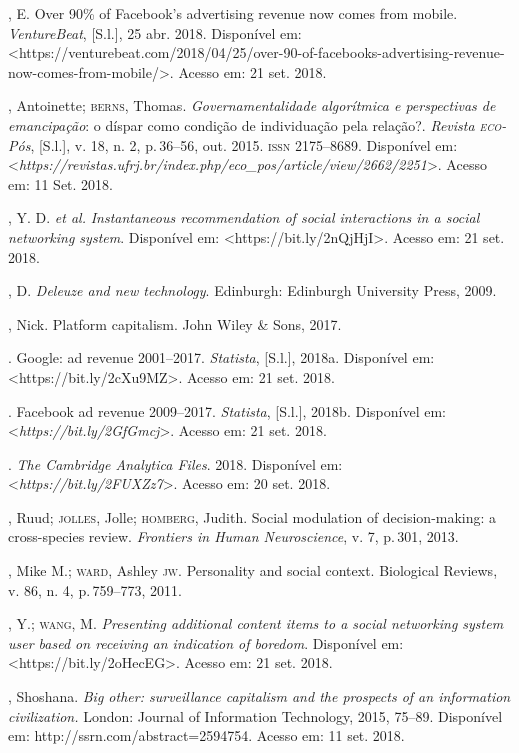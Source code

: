 \begin{bibliohedra}
, E. Over 90\% of Facebook's advertising revenue now comes
from mobile. \emph{VentureBeat}, {[}S.l.{]}, 25 abr. 2018. Disponível
em:
\textless{}https://venturebeat.com/2018/04/25/over-90-of-facebooks-advertising-revenue-now-comes-from-mobile/\textgreater{}.
Acesso em: 21 set. 2018.

, Antoinette; \textsc{berns}, Thomas. \emph{Governamentalidade
algorítmica e perspectivas de emancipação}: o díspar como condição de
individuação pela relação?. \emph{Revista \textsc{eco}-Pós}, {[}S.l.{]}, v. 18,
n. 2, p.\,36--56, out. 2015. \textsc{issn} 2175--8689. Disponível em:
\textless{}\emph{https://revistas.ufrj.br/index.php/eco\_pos/article/view/2662/2251}\textgreater{}.
Acesso em: 11 Set. 2018.

, Y. D. \emph{et al.} \emph{Instantaneous recommendation of
social interactions in a social networking system}. Disponível em:
\textless{}https://bit.ly/2nQjHjI\textgreater{}.
Acesso em: 21 set. 2018.

, D. \emph{Deleuze and new technology}. Edinburgh: Edinburgh
University Press, 2009.

, Nick. Platform capitalism. John Wiley \& Sons, 2017.

. Google: ad revenue 2001--2017. \emph{Statista}, {[}S.l.{]},
2018a. Disponível em: \textless{}https://bit.ly/2cXu9MZ\textgreater{}.
Acesso em: 21 set. 2018.

\titidem. Facebook ad revenue 2009--2017. \emph{Statista},
{[}S.l.{]}, 2018b. Disponível em:
\textless{}\emph{https://bit.ly/2GfGmcj}\textgreater{}.
Acesso em: 21 set. 2018.

. \emph{The Cambridge Analytica Files}. 2018. Disponível
em: \textless{}\emph{https://bit.ly/2FUXZz7}\textgreater{}. Acesso em: 20 set. 2018.

, Ruud; \textsc{jolles}, Jolle; \textsc{homberg}, Judith. Social modulation of
decision-making: a cross-species review. \emph{Frontiers in Human
Neuroscience}, v. 7, p.\,301, 2013.

, Mike M.; \textsc{ward}, Ashley \textsc{jw}. Personality and social context.
Biological Reviews, v. 86, n. 4, p.\,759--773, 2011.

, Y.; \textsc{wang}, M. \emph{Presenting additional content items to a social
networking system user based on receiving an indication of boredom}.
Disponível em:
\textless{}https://bit.ly/2oHecEG\textgreater{}.
Acesso em: 21 set. 2018.

, Shoshana. \emph{Big other: surveillance capitalism and the
prospects of an information civilization.} London: Journal of
Information Technology, 2015, 75--89. Disponível em:
http://ssrn.com/abstract=2594754. Acesso em: 11 set. 2018.
\end{bibliohedra}


